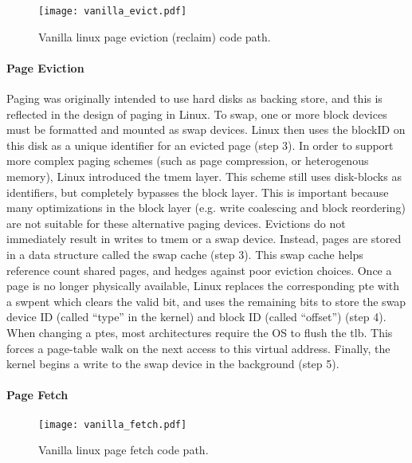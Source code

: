 \begin{figure}[h] \centering
  \texttt{[image: vanilla\_evict.pdf]}
  \caption{Vanilla linux page eviction (reclaim) code path.}
  \label{fig:vanilla_evict}
\end{figure}

\paragraph{Page Eviction}
Paging was originally intended to use hard disks as backing store, and this is
reflected in the design of paging in Linux. To swap, one or more block
devices must be formatted and mounted as swap devices. Linux then uses the
blockID on this disk as a unique identifier for an evicted page (step 3). In
order to support more complex paging schemes (such as page compression, or
heterogenous memory), Linux introduced the \gls{tmem} layer\cite{tmem}. This
scheme still uses disk-blocks as identifiers, but completely bypasses the block
layer. This is important because many optimizations in the block layer (e.g.
write coalescing and block reordering) are not suitable for these alternative
paging devices. Evictions do not immediately result in writes to \gls{tmem} or
a swap device. Instead, pages are stored in a data structure called the swap
cache (step 3). This swap cache helps reference count shared pages, and hedges
against poor eviction choices. Once a page is no longer physically available,
Linux replaces the corresponding \gls{pte} with a \gls{swpent} which clears the
valid bit, and uses the remaining bits to store the swap device ID (called
``type'' in the kernel) and block ID (called ``offset'') (step 4).  When
changing a \glspl{pte}, most architectures require the OS to flush the
\gls{tlb}. This forces a page-table walk on the next access to this virtual
address. Finally, the kernel begins a write to the swap device in the
background (step 5).

\paragraph{Page Fetch}

\begin{figure}[h] \centering
  \texttt{[image: vanilla\_fetch.pdf]}
  \caption{Vanilla linux page fetch code path.}
  \label{fig:vanilla_fetch}
\end{figure}

